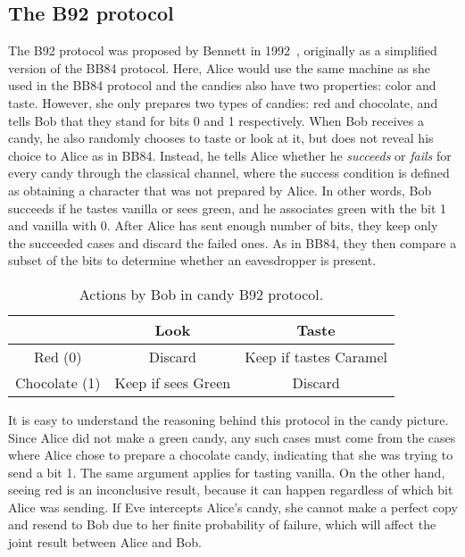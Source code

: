 \documentclass{article}
\begin{document}
\subsection{The B92 protocol}
The B92 protocol was proposed by Bennett in 1992~\cite{bennett1992quantum}, originally as a simplified version of the BB84 protocol.
Here, Alice would use the same machine as she used in the BB84 protocol and the candies also have two properties: color and taste.
However, she only prepares two types of candies: red and chocolate, and tells Bob that they stand for bits 0 and 1 respectively.
When Bob receives a candy, he also randomly chooses to taste or look at it, but does not reveal his choice to Alice as in BB84.
Instead, he tells Alice whether he \textit{succeeds} or \textit{fails} for every candy through the classical channel, where the success condition is defined as obtaining a character that was not prepared by Alice.
In other words, Bob succeeds if he tastes vanilla or sees green, and he associates green with the bit 1 and vanilla with 0.
After Alice has sent enough number of bits, they keep only the succeeded cases and discard the failed ones.
As in BB84, they then compare a subset of the bits to determine whether an eavesdropper is present.

\begin{table}[h!]
	\centering
	\begin{tabular}{ |c|c|c| } 
		\hline
		\backslashbox{Alice}{Bob} & Look & Taste \\ 
		\hline 
		Red (0) & Discard & Keep if tastes Caramel \\
		\hline 
		Chocolate (1) & Keep if sees Green & Discard \\ 
		\hline
	\end{tabular}
	\caption{Actions by Bob in candy B92 protocol.}
	\label{table3}
\end{table}

It is easy to understand the reasoning behind this protocol in the candy picture.
Since Alice did not make a green candy, any such cases must come from the cases where Alice chose to prepare a chocolate candy, indicating that she was trying to send a bit 1.
The same argument applies for tasting vanilla.
On the other hand, seeing red is an inconclusive result, because it can happen regardless of which bit Alice was sending.
If Eve intercepts Alice's candy, she cannot make a perfect copy and resend to Bob due to her finite probability of failure, which will affect the joint result between Alice and Bob.
\end{document}
